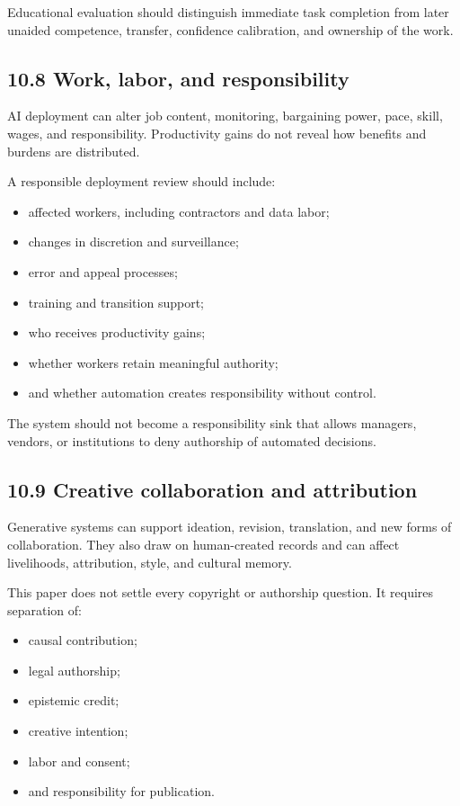 \documentclass[
  11pt,
]{article}
\providecommand{\tightlist}{%
  \setlength{\itemsep}{0pt}\setlength{\parskip}{0pt}}
\begin{document}
Educational evaluation should distinguish immediate task completion from
later unaided competence, transfer, confidence calibration, and
ownership of the work.

\subsection{10.8 Work, labor, and
responsibility}\label{work-labor-and-responsibility}

AI deployment can alter job content, monitoring, bargaining power, pace,
skill, wages, and responsibility. Productivity gains do not reveal how
benefits and burdens are distributed.

A responsible deployment review should include:

\begin{itemize}
\tightlist
\item
  affected workers, including contractors and data labor;
\item
  changes in discretion and surveillance;
\item
  error and appeal processes;
\item
  training and transition support;
\item
  who receives productivity gains;
\item
  whether workers retain meaningful authority;
\item
  and whether automation creates responsibility without control.
\end{itemize}

The system should not become a responsibility sink that allows managers,
vendors, or institutions to deny authorship of automated decisions.

\subsection{10.9 Creative collaboration and
attribution}\label{creative-collaboration-and-attribution}

Generative systems can support ideation, revision, translation, and new
forms of collaboration. They also draw on human-created records and can
affect livelihoods, attribution, style, and cultural memory.

This paper does not settle every copyright or authorship question. It
requires separation of:

\begin{itemize}
\tightlist
\item
  causal contribution;
\item
  legal authorship;
\item
  epistemic credit;
\item
  creative intention;
\item
  labor and consent;
\item
  and responsibility for publication.
\end{itemize}
\end{document}
